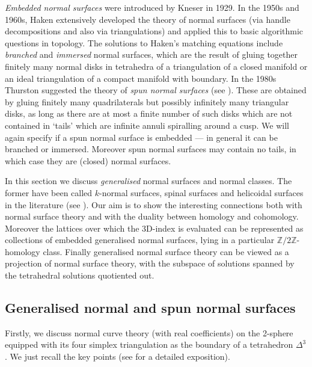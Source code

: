 \documentclass[12pt,reqno]{amsart}  %
\theoremstyle{definition}
\theoremstyle{remark}
\def\Z{\mathbb Z}
\begin{document}
{\em Embedded normal surfaces} were introduced by Kneser \cite{Kn} in 1929. 
In the 1950s and 1960s, Haken \cite{Ha1,Ha2,Ha3} extensively developed the 
theory of normal surfaces (via handle decompositions and also via 
triangulations) and applied this to basic algorithmic questions in topology.  
The solutions to Haken's matching equations include {\em branched} and 
{\em immersed} normal surfaces, which are the result of gluing together 
finitely many normal disks in tetrahedra of a triangulation of a closed 
manifold or  an ideal triangulation of a compact manifold with boundary.
In the 1980s  Thurston suggested the theory of 
{\em spun normal surfaces }(see \cite{Ti,Wa}). These are obtained by 
gluing finitely many quadrilaterals but possibly infinitely many 
triangular disks, as long as there are at most a finite number of such 
disks which are not contained in `tails' which are infinite annuli 
spiralling around a cusp. We will again specify if a spun normal surface 
is embedded --- in general it can be branched or immersed. 
Moreover spun normal surfaces may contain no tails, in which case they are 
(closed) normal surfaces. 

In this section we discuss {\em generalised} normal surfaces and 
normal classes. The former have been called $k$-normal surfaces, 
spinal surfaces and helicoidal surfaces in the literature 
(see \cite{Ma2,FoMa,FrKa,Ba}). 
Our aim is to show the interesting connections both with normal surface 
theory and with the duality between homology and cohomology. 
Moreover the lattices over which the 3D-index is evaluated can be 
represented as collections of embedded generalised normal surfaces, 
lying in a particular $\Z/2\Z$-homology class. Finally generalised normal 
surface theory can be viewed as a projection of normal surface theory, 
with the subspace of solutions spanned by the tetrahedral solutions 
quotiented out. 

\subsection{Generalised normal and spun normal surfaces}

Firstly, we discuss normal curve theory (with real coefficients) 
on the 2-sphere equipped with its four simplex triangulation as the boundary 
of a tetrahedron $\Delta^3$. We just recall the key points 
(see \cite[Section 3.2]{Ma2} for a detailed exposition).  
\end{document}
